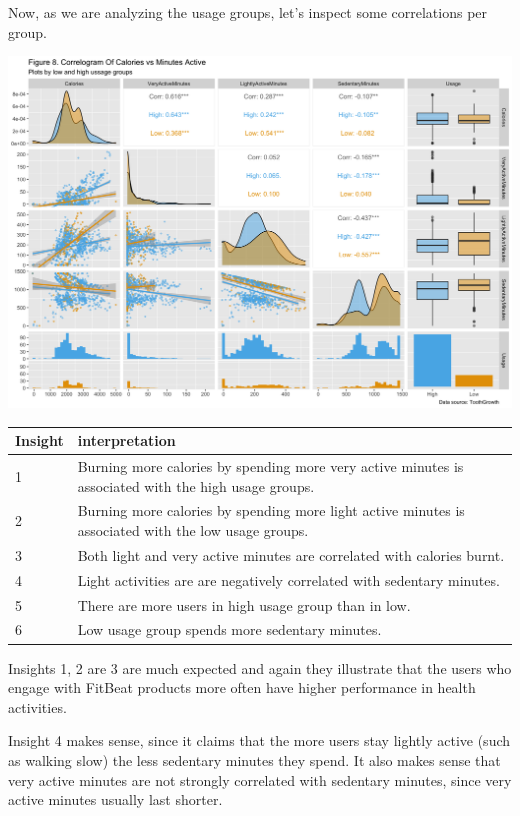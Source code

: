 \documentclass[
]{article}
\begin{document}
Now, as we are analyzing the usage groups, let's inspect some
correlations per group.

\includegraphics[width=0.9\linewidth]{./figs/correlogram3}

\begin{table}
\centering\begingroup\fontsize{14}{16}\selectfont

\begin{tabular}[t]{l|l}
\hline
Insight & interpretation\\
\hline
1 & Burning more calories by spending more very active minutes is associated with the high usage groups.\\
\hline
2 & Burning more calories by spending more light active minutes is associated with the low usage groups.\\
\hline
3 & Both light and very active minutes are correlated with calories burnt.\\
\hline
4 & Light activities are are negatively correlated with sedentary minutes.\\
\hline
5 & There are more users in high usage group than in low.\\
\hline
6 & Low usage group spends more sedentary minutes.\\
\hline
\end{tabular}
\endgroup{}
\end{table}

Insights 1, 2 are 3 are much expected and again they illustrate that the
users who engage with FitBeat products more often have higher
performance in health activities.

Insight 4 makes sense, since it claims that the more users stay lightly
active (such as walking slow) the less sedentary minutes they spend. It
also makes sense that very active minutes are not strongly correlated
with sedentary minutes, since very active minutes usually last shorter.
\end{document}
